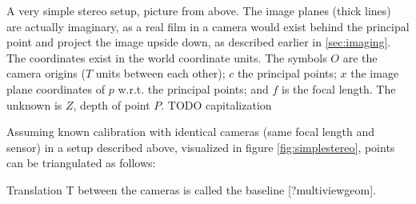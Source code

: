 {A very simple stereo setup, picture from above. The image planes (thick lines) are actually imaginary, as a real film in a camera would exist behind the principal point and project the image upside down, as described earlier in \ref{sec:imaging}. The coordinates exist in the world coordinate units. The symbols $O$ are the camera origins ($T$ units between each other); $c$ the principal points; $x$ the image plane coordinates of $p$ w.r.t. the principal points; and $f$ is the focal length. The unknown is $Z$, depth of point $P$. TODO capitalization}

Assuming known calibration with identical cameras (same focal length and sensor) in a setup described above, visualized in figure \ref{fig:simplestereo}, points can be triangulated as follows:

Translation T between the cameras is called the baseline [?multiviewgeom].

